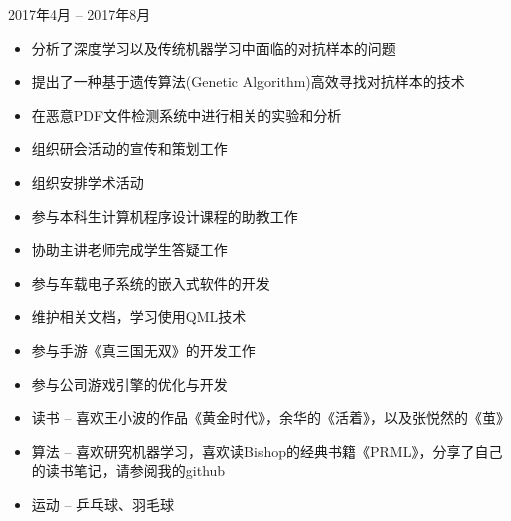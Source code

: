 ﻿\documentclass{resume}
\begin{document}
 {2017年4月 -- 2017年8月}
\begin{itemize}
	\item 分析了深度学习以及传统机器学习中面临的对抗样本的问题
	\item 提出了一种基于遗传算法(Genetic Algorithm)高效寻找对抗样本的技术
    \item 在恶意PDF文件检测系统中进行相关的实验和分析
\end{itemize}

\StudentTeams
{}
\begin{itemize}
	\item 组织研会活动的宣传和策划工作
	\item 组织安排学术活动
\end{itemize}

\begin{itemize}
    \item 参与本科生计算机程序设计课程的助教工作
    \item 协助主讲老师完成学生答疑工作
\end{itemize}

\OtherWorkExperience

\begin{itemize}
	\item 参与车载电子系统的嵌入式软件的开发
	\item 维护相关文档，学习使用QML技术
\end{itemize}

\begin{itemize}
	\item 参与手游《真三国无双》的开发工作
	\item 参与公司游戏引擎的优化与开发
\end{itemize}


\Intrests

\begin{itemize}
	\item 读书 -- 喜欢王小波的作品《黄金时代》，余华的《活着》，以及张悦然的《茧》
	\item 算法 -- 喜欢研究机器学习，喜欢读Bishop的经典书籍《PRML》，分享了自己的读书笔记，请参阅我的github
    \item 运动 -- 乒乓球、羽毛球
\end{itemize}
\end{document}
